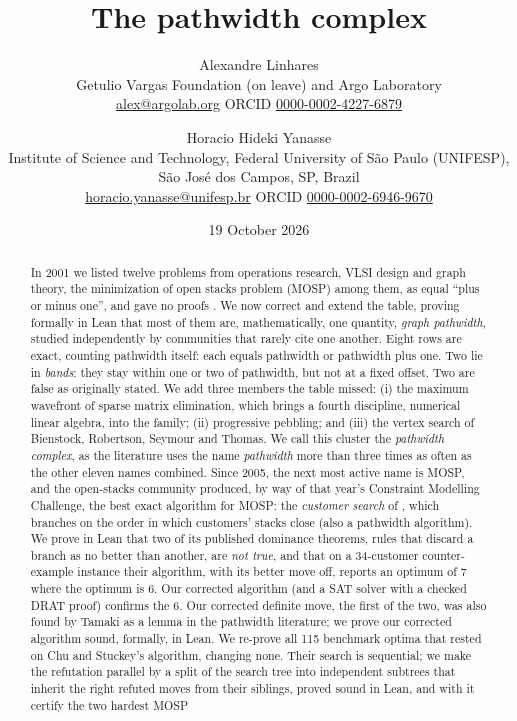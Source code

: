 \documentclass[11pt,letterpaper]{article}
\title{The pathwidth complex}
\author{Alexandre Linhares\\{\small Getulio Vargas Foundation (on leave) and Argo Laboratory}\\{\small \href{mailto:alex@argolab.org}{alex@argolab.org} \quad ORCID \href{https://orcid.org/0000-0002-4227-6879}{0000-0002-4227-6879}} \and
Horacio Hideki Yanasse\\{\small Institute of Science and Technology, Federal University of São Paulo (UNIFESP), São José dos Campos, SP, Brazil}\\{\small \href{mailto:horacio.yanasse@unifesp.br}{horacio.yanasse@unifesp.br} \quad ORCID \href{https://orcid.org/0000-0002-6946-9670}{0000-0002-6946-9670}}}
\date{19 October 2026}
\numberwithin{figure}{section}
\numberwithin{table}{section}
\theoremstyle{plain}
\theoremstyle{definition}
\theoremstyle{remark}
\begin{document}
\maketitle

\begin{abstract}
\noindent
In 2001 we listed twelve problems from operations research, VLSI
design and graph theory, the minimization of open stacks problem (MOSP) among
them, as equal ``plus or minus one'', and gave no proofs
\citep{Linhares2001,LY2002}. We now correct and extend the table, proving formally in Lean that most of
them are, mathematically, one quantity, \emph{graph pathwidth}, studied
independently by communities that rarely cite one another. Eight rows are exact,
counting pathwidth itself: each equals pathwidth or pathwidth plus one. Two lie
in \emph{bands}: they stay within one or two of pathwidth, but not at a fixed
offset. Two are false as originally stated. We add three members the table missed:
(i) the maximum wavefront of sparse matrix elimination, which brings a fourth
discipline, numerical linear algebra, into the family; (ii) progressive
pebbling; and (iii) the vertex search of Bienstock, Robertson, Seymour and
Thomas. We call this cluster the
\emph{pathwidth complex}, as the literature uses the name \emph{pathwidth} more
than three times as often as the other eleven names combined. Since 2005, the
next most active name is MOSP, and the open-stacks community produced, by way
of that year's Constraint Modelling Challenge, the best exact algorithm for
MOSP: the \emph{customer search} of \citet{ChuStuckey2009}, which branches on the order in which customers' stacks close (also a
pathwidth algorithm). We prove in Lean that two of its published dominance theorems,
rules that discard a branch as no better than another, are \emph{not true},
and that on a 34-customer counter-example instance their algorithm, with its better move off, reports an
optimum of 7 where the optimum is 6. Our corrected algorithm (and a SAT solver with a checked DRAT proof) confirms the 6. Our corrected definite move,
the first of the two, was also found by Tamaki as a lemma
\citep[Lemma~1]{Kitsunai2016} in the pathwidth literature; we prove our
corrected algorithm sound, formally, in Lean. We re-prove all 115 benchmark
optima that rested on Chu and Stuckey's algorithm, changing none. Their search
is sequential; we make the refutation parallel by a split of the search tree
into independent subtrees that inherit the right refuted moves from their
siblings, proved sound in Lean, and with it certify the two hardest MOSP

\end{abstract}
\end{document}
